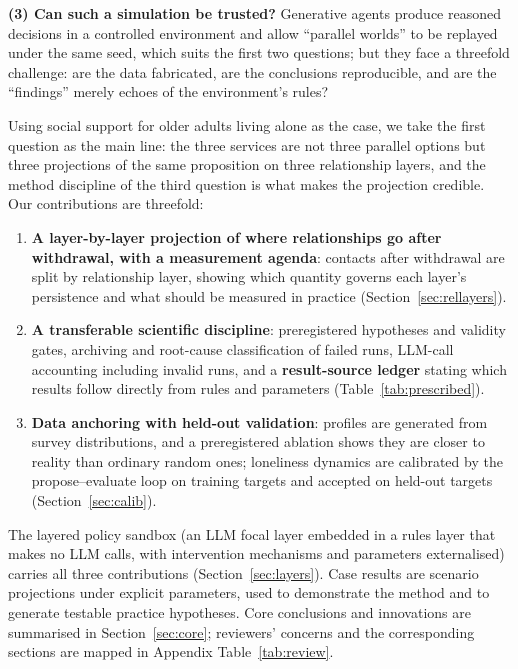 \documentclass[10pt,twocolumn]{article}
\begin{document}
\textbf{(3) Can such a simulation be trusted?} Generative agents\citep{park2023generative} produce reasoned decisions in a controlled environment and allow ``parallel worlds'' to be replayed under the same seed, which suits the first two questions; but they face a threefold challenge: are the data fabricated, are the conclusions reproducible, and are the ``findings'' merely echoes of the environment's rules?

Using social support for older adults living alone as the case, we take the first question as the main line: the three services are not three parallel options but three projections of the same proposition on three relationship layers, and the method discipline of the third question is what makes the projection credible. Our contributions are threefold:

\begin{enumerate}
  \item \textbf{A layer-by-layer projection of where relationships go after withdrawal, with a measurement agenda}: contacts after withdrawal are split by relationship layer, showing which quantity governs each layer's persistence and what should be measured in practice (Section~\ref{sec:rellayers}).
  \item \textbf{A transferable scientific discipline}: preregistered hypotheses and validity gates, archiving and root-cause classification of failed runs, LLM-call accounting including invalid runs, and a \textbf{result-source ledger} stating which results follow directly from rules and parameters (Table~\ref{tab:prescribed}).
  \item \textbf{Data anchoring with held-out validation}: profiles are generated from survey distributions, and a preregistered ablation shows they are closer to reality than ordinary random ones; loneliness dynamics are calibrated by the propose--evaluate loop on training targets and accepted on held-out targets (Section~\ref{sec:calib}).
\end{enumerate}
The layered policy sandbox (an LLM focal layer embedded in a rules layer that makes no LLM calls, with intervention mechanisms and parameters externalised) carries all three contributions (Section~\ref{sec:layers}).
Case results are scenario projections under explicit parameters, used to demonstrate the method and to generate testable practice hypotheses. Core conclusions and innovations are summarised in Section~\ref{sec:core}; reviewers' concerns and the corresponding sections are mapped in Appendix Table~\ref{tab:review}.
\end{document}
